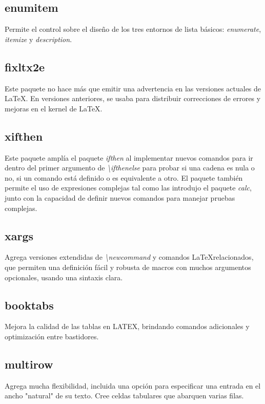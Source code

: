 \documentclass[12pt]{article}
\begin{document}
\subsection{enumitem}
Permite el control sobre el diseño de los tres entornos de lista básicos: \textit{enumerate}, \textit{itemize} y \textit{description}.\cite{enumitem}
\subsection{fixltx2e}
Este paquete no hace más que emitir una advertencia en las versiones actuales de \LaTeX. En versiones anteriores, se usaba para distribuir correcciones de errores y mejoras en el kernel de \LaTeX. \cite{fixltx2e}
\subsection{xifthen}
Este paquete amplía el paquete \textit{ifthen} al implementar nuevos comandos para ir dentro del primer argumento de \textit{\textbackslash ifthenelse} para probar si una cadena es nula o no, si un comando está definido o es equivalente a otro. El paquete también permite el uso de expresiones complejas tal como las introdujo el paquete \textit{calc}, junto con la capacidad de definir nuevos comandos para manejar pruebas complejas.\cite{xifthen}
\subsection{xargs}
Agrega versiones extendidas de \textit{\textbackslash newcommand} y comandos \LaTeX relacionados, que permiten una definición fácil y robusta de macros con muchos argumentos opcionales, usando una sintaxis clara.\cite{xargs}
\subsection{booktabs}
Mejora la calidad de las tablas en LATEX, brindando comandos adicionales y optimización entre bastidores.\cite{booktabs}
\subsection{multirow}
Agrega mucha flexibilidad, incluida una opción para especificar una entrada en el ancho "natural" de su texto. Cree celdas tabulares que abarquen varias filas.\cite{multirow}

\newpage


\end{document}
